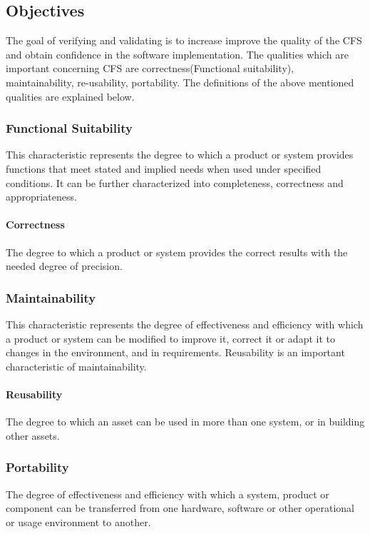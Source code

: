 \documentclass[12pt, titlepage]{article}
\newcommand{\famname}{CFS} %
\begin{document}

\subsection{Objectives}

The goal of verifying and validating is to increase improve the quality of the \famname{} and obtain confidence in the software implementation. The qualities which are important concerning \famname{} are correctness(Functional suitability), maintainability, re-usability, portability. The definitions of the above mentioned qualities are explained below.

\subsubsection {Functional Suitability}

This characteristic represents the degree to which a product or system provides
functions that meet stated and implied needs when used under specified
conditions. It can be further characterized into completeness, correctness and
appropriateness.
\paragraph{Correctness }
The degree to which a product or system provides the correct results with the
needed degree of precision.

\subsubsection{Maintainability}
This characteristic represents the degree of effectiveness and efficiency with
which a product or system can be modified to improve it, correct it or adapt it
to changes in the environment, and in requirements. Reusability is an important characteristic of maintainability.
\paragraph{Reusability}
The degree to which an asset can be used in more than one system, or in
building other assets.

\subsubsection{Portability}
The degree of effectiveness and efficiency with which a system, product or
component can be transferred from one hardware, software or other operational
or usage environment to another. 
\end{document}
